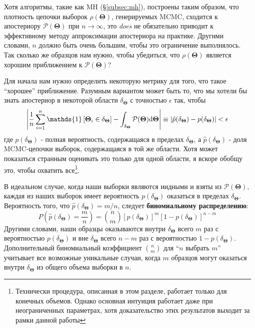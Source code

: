 \documentclass[12pt, titlepage]{article}
\newcommand{\deriv}{\ensuremath{{\rm d}}}  %
\newcommand{\indicator}[1]{\ensuremath{\mathds{1}\left[{#1}\right]}}
\newcommand{\params}{\ensuremath{\boldsymbol\Theta}}
\newcommand{\posterior}{\ensuremath{\mathcal{P}}}
\begin{document}
Хотя алгоритмы, такие как MH (\S\ref{subsec:mh}), построены таким образом, что плотность цепочки выборок $\rho(\params)$, генерируемых MCMC, сходится к апостериору $\posterior(\params)$ при $n \rightarrow \infty$, это \textit{does} не обязательно приводит к эффективному методу аппроксимации апостериора на практике. Другими словами, $n$ должно быть очень большим, чтобы это ограничение выполнялось. Так сколько же образцов нам нужно, чтобы убедиться, что $\rho(\params)$ является хорошим приближением к $\posterior(\params)$?

Для начала нам нужно определить некоторую метрику для того, что такое ``хорошее'' приближение. Разумным вариантом может быть то, что мы хотели бы знать апостериор в некоторой области $\delta_{\params}$ с точностью $\epsilon$ так, чтобы
\begin{equation}
    \left| \frac{1}{n} \sum_{i=1}^{n} \indicator{\params_i \in \delta_{\params}} 
    - \int_{\delta_{\params}} \posterior(\params) \deriv \params \right|
    \equiv |\hat{p}(\delta_{\params}) - p(\delta_{\params})| < \epsilon
\end{equation}
где $p(\delta_{\params})$ - полная вероятность, содержащаяся в пределах $\delta_{\params}$, а $\hat{p}(\delta_{\params})$ - доля MCMC-цепочки выборок, содержащаяся в той же области. Хотя может показаться странным оценивать это только для одной области, я вскоре обобщу это, чтобы охватить все\footnote{Технически процедура, описанная в этом разделе, работает только для конечных объемов. Однако основная интуиция работает даже при неограниченных параметрах, хотя доказательство этих результатов выходит за рамки данной работы}.

В идеальном случае, когда наши выборки являются иидными и взяты из $\posterior(\params)$, каждая из наших выборок имеет вероятность $p(\delta_{\params})$ оказаться в пределах $\delta_{\params}$. Вероятность того, что $\hat{p}(\delta_{\params}) = m/n$, следует \textbf{биномиальному распределению}:
\begin{equation}
    P\left(\hat{p}(\delta_{\params}) = \frac{m}{n} \right) 
    = \binom{n}{m} \left[p(\delta_{\params})\right]^m
    \left[1 - p(\delta_{\params}) \right]^{n-m}
\end{equation}
Другими словами, наши образцы оказываются внутри $\delta_{\params}$ всего $m$ раз с вероятностью $p(\delta_{\params})$ и вне $\delta_{\params}$ всего $n-m$ раз с вероятностью $1 - p(\delta_{\params})$. Дополнительный биномиальный коэффициент $\binom{n}{m}$ для ``$n$ выбрать $m$'' учитывает все возможные уникальные случаи, когда $m$ образцов могут оказаться внутри $\delta_{\params}$ из общего объема выборки в $n$.
\end{document}
